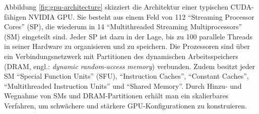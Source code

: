 \documentclass[crop=false]{standalone}
\begin{document}
        Abbildung \ref{fig:gpu-architecture} skizziert die Architektur einer typischen CUDA-fähigen NVIDIA GPU.
        Sie besteht aus einem Feld von 112 \enquote{Streaming Processor Cores} (SP), die wiederum in 14 \enquote{Multithreaded Streaming Multiprocessors} (SM) eingeteilt sind.
        Jeder SP ist dazu in der Lage, bis zu 100 parallele Threads in seiner Hardware zu organisieren und zu speichern.
        Die Prozessoren sind über ein Verbindungsnetzwerk mit Partitionen des dynamischen Arbeitsspeichers (DRAM, engl.: \textit{dynamic random-access memory}) verbunden.
        Zudem besitzt jeder SM \enquote{Special Function Units} (SFU), \enquote{Instruction Caches}, \enquote{Constant Caches}, \enquote{Multithreaded Instruction Units} und \enquote{Shared Memory}.
        Durch Hinzu- und Wegnahme von SMs und DRAM-Partitionen erhält man ein skalierbares Verfahren, um schwächere und stärkere GPU-Konfigurationen zu konstruieren.

\end{document}
